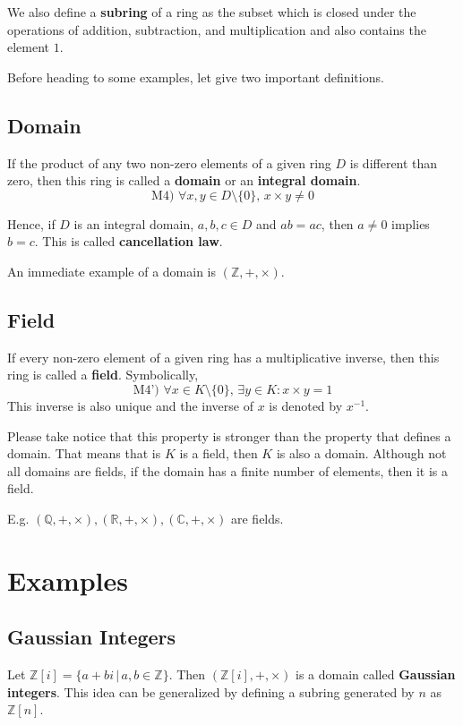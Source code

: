 \documentclass[12pt,a4paper]{article}
\begin{document}
We also define a \textbf{subring} of a ring as the subset which is closed under the operations of addition, subtraction, and multiplication and also contains the element $1$.

Before heading to some examples, let give two important definitions.

\subsection{Domain}\label{domain}

If the product of any two non-zero elements of a given ring \(D\) is different than zero, then this ring is called a \textbf{domain} or an \textbf{integral domain}.
\[\text{M4) } \forall x, y \in D \setminus \{ 0 \}, \, x \times y \neq 0\]

Hence, if $D$ is an integral domain, $a,b,c \in D$ and $ab = ac$, then $a \neq 0$ implies $b=c$. This is called \textbf{cancellation law}.

An immediate example of a domain is $(\mathbb{Z}, +, \times)$.

\subsection{Field}\label{field}

If every non-zero element of a given ring has a multiplicative inverse, then this ring is called a \textbf{field}. Symbolically,
\[\text{M4') }\forall x \in K \setminus \{0 \}, \, \exists y \in K : x \times y = 1\]
This inverse is also unique and the inverse of $x$ is denoted by $x^{-1}$.

Please take notice that this property is stronger than the property that defines a domain. That means that is \(K\) is a field, then \(K\) is also a domain. Although not all domains are fields, if the domain has a finite number of elements, then it is a field.

E.g. \((\mathbb{Q},+,\times), (\mathbb{R},+,\times), (\mathbb{C},+,\times)\) are fields.

\section{Examples}

\subsection{Gaussian Integers}

Let \(\mathbb{Z}[i] = \{ a+ bi \, |  \, a,b \in \mathbb{Z} \}\). Then \((\mathbb{Z}[i], +, \times)\) is a domain called \textbf{Gaussian integers}. This idea can be generalized by defining a subring generated by $n$ as $\mathbb{Z}[n]$.
\end{document}

